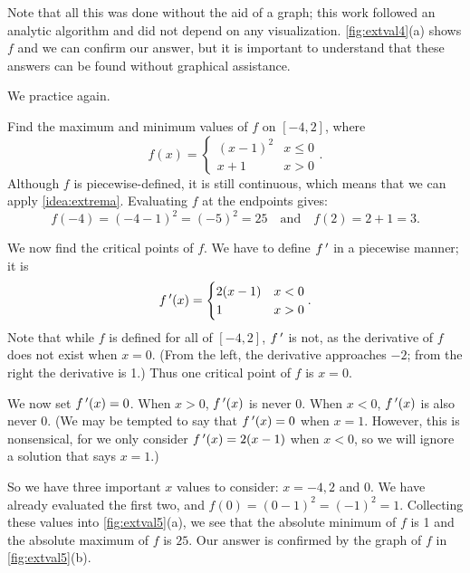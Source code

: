 Note that all this was done without the aid of a graph; this work followed an analytic algorithm and did not depend on any visualization. \autoref{fig:extval4}(a) shows $f$ and we can confirm our answer, but it is important to  understand that these answers can be found without graphical assistance.

We practice again.

\begin{example}\label{ex_extval5}%
Find the maximum and minimum values of $f$ on $[-4,2]$, where
\[f(x) = \begin{cases} (x-1)^2 & x\leq 0 \\ x+1 & x>0 \end{cases}.\]
\solution
Although $f$ is piecewise-defined, it is still continuous, which means that we can apply \autoref{idea:extrema}. Evaluating $f$ at the endpoints gives: 
\[f(-4)=(-4-1)^2=(-5)^2 = 25 \quad \text{and} \quad f(2)=2+1 = 3.\]

We now find the critical points of $f$. We have to define $f\,'$ in a piecewise manner; it is
\[f\,'(x) =\begin{cases} 2(x-1) & x < 0 \\ 1 & x>0 \end{cases} .\]
Note that while $f$ is defined for all of $[-4,2]$, $f\,'$ is not, as the derivative of $f$ does not exist when $x=0$. (From the left, the derivative approaches $-2$; from the right the derivative is 1.) Thus one critical point of $f$ is $x=0$.

We now set $f\,'(x) = 0$. When $x >0$, $f\,'(x)$ is never 0.  When $x<0$, $f\,'(x)$ is also never 0. (We may be tempted to say that $f\,'(x) = 0 $ when $x=1$. However, this is nonsensical, for we only consider $f\,'(x) = 2(x-1)$ when $x<0$, so we will ignore a solution that says $x=1$.) 

So we have three important $x$ values to consider: $x= -4, 2$ and $0$. We have already evaluated the first two, and $f(0)=(0-1)^2=(-1)^2=1$.  Collecting these values into \autoref{fig:extval5}(a), we see that the absolute minimum of $f$ is 1 and the absolute maximum of $f$ is $25$. Our answer is confirmed by the graph of $f$ in \autoref{fig:extval5}(b).
\end{example}

